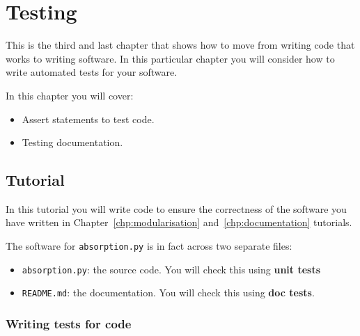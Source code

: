 \chapter{Testing}
\label{\detokenize{building-tools/07-testing/introduction/main:testing}}\label{\detokenize{building-tools/07-testing/introduction/main::doc}}

This is the third and last chapter that shows how to move from writing code
that works to writing software. In this particular chapter you will consider how
to write automated tests for your software.

\begin{note}
In this chapter you will cover:
\begin{itemize}
\item 

Assert statements to test code.

\item 

Testing documentation.

\end{itemize}
\end{note}





\section{Tutorial}
\label{sec:testing_tutorial}

In this tutorial you will write code to ensure the correctness of the software
you
have written in Chapter~\ref{chp:modularisation} and~\ref{chp:documentation}
tutorials.

The software for \texttt{absorption.py} is in fact across two separate files:
\begin{itemize}
\item 

\texttt{absorption.py}: the source code. You will check this using \textbf{unit tests}

\item 

\texttt{README.md}: the documentation. You will check this using \textbf{doc tests}.

\end{itemize}


\subsection{Writing tests for code}
\label{\detokenize{building-tools/07-testing/tutorial/main:writing-tests-for-code}}

